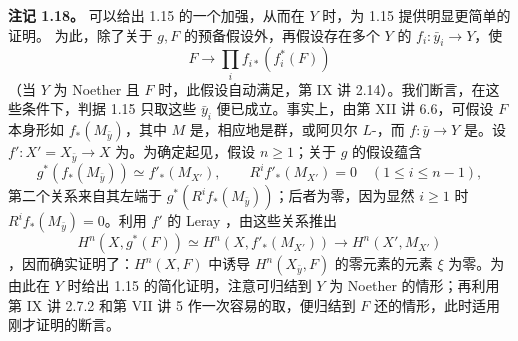 \textbf{注记 1.18。}
可以给出 1.15 的一个加强，从而在 $Y$ 时，为 1.15 提供明显更简单的证明。
为此，除了关于 $g,F$ 的预备假设外，再假设存在多个 $Y$ 的 $f_i:\bar y_i\to Y$，使
\[F\longrightarrow\prod_i f_{i*}(f_i^*(F))\]
（当 $Y$ 为 Noether 且 $F$ 时，此假设自动满足，第 IX 讲 2.14）。我们断言，在这些条件下，判据 1.15 只取这些 $\bar y_i$ 便已成立。事实上，由第 XII 讲 6.6，可假设 $F$ 本身形如 $f_*(M_{\bar y})$，其中 $M$ 是，相应地是群，或阿贝尔 $L$-，而 $f:\bar y\to Y$ 是。设 $f':X'=X_{\bar y}\to X$ 为。为确定起见，假设 $n\geq1$；关于 $g$ 的假设蕴含
\[g^*(f_*(M_{\bar y}))\simeq f'_*(M_{X'}),\qquad R^if'_*(M_{X'})=0\quad(1\leq i\leq n-1),\]
第二个关系来自其左端于 $g^*(R^if_*(M_{\bar y}))$；后者为零，因为显然 $i\geq1$ 时 $R^if_*(M_{\bar y})=0$。利用 $f'$ 的 Leray ，由这些关系推出
\[H^n(X,g^*(F))\simeq H^n(X,f'_*(M_{X'}))\longrightarrow H^n(X',M_{X'})\]
，因而确实证明了：$H^n(X,F)$ 中诱导 $H^n(X_{\bar y},F)$ 的零元素的元素 $\xi$ 为零。为由此在 $Y$ 时给出 1.15 的简化证明，注意可归结到 $Y$ 为 Noether 的情形；再利用第 IX 讲 2.7.2 和第 VII 讲 5 作一次容易的取，便归结到 $F$ 还的情形，此时适用刚才证明的断言。

